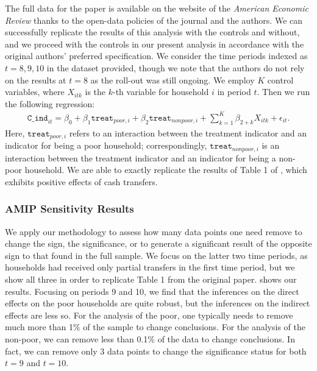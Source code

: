 The full data for the paper is available on the website of the \emph{American
Economic Review} thanks to the open-data policies of the journal and the
authors. We can successfully replicate the results of this analysis with the
controls and without, and we proceed with the controls in our present analysis
in accordance with the original authors' preferred specification. We consider
the time periods indexed as $t=8,9,10$ in the dataset provided, though we note
that the authors do not rely on the results at $t = 8$ as the roll-out was still
ongoing. We employ $K$ control variables, where $X_{itk}$ is the $k$-th variable
for household $i$ in period $t$. Then we run the following regression:
%
\begin{align*}
%
\texttt{C\_ind}_{it} = \beta_0 + \beta_1 \texttt{treat}_{poor,i} + \beta_2
\texttt{treat}_{nonpoor,i} + \sum_{k = 1}^K \beta_{2+k}X_{itk} + \epsilon_{it}.
%
\end{align*}
%
Here, $\texttt{treat}_{poor,i}$ refers to an interaction between the treatment
indicator and an indicator for being a poor household; correspondingly,
$\texttt{treat}_{nonpoor,i}$ is an interaction between the treatment indicator
and an indicator for being a non-poor household.  We are able to exactly
replicate the results of Table 1 of \citet{angelucci2009indirect}, which
exhibits positive effects of cash transfers.

\subsubsection{AMIP Sensitivity Results}

\CashTransfersResultsTable{}
We apply our methodology to assess how many data points one need remove to
change the sign, the significance, or to generate a significant result of the
opposite sign to that found in the full sample. We focus on the latter two time
periods, as households had received only partial transfers in the first time
period, but we show all three in order to replicate Table 1 from the original
paper.  shows our results. Focusing on
periods 9 and 10, we find that the inferences on the direct effects on the poor
households are quite robust, but the inferences on the indirect effects are less
so. For the analysis of the poor, one typically needs to remove much more than
1\% of the sample to change conclusions. For the analysis of the non-poor, we
can remove less than 0.1\% of the data to change conclusions. In fact, we can
remove only 3 data points to change the significance status for both $t = 9$ and
$t = 10$.

